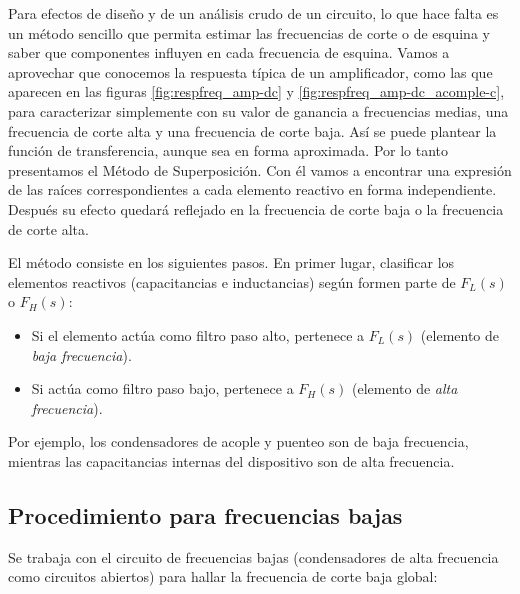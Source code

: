 Para efectos de diseño y de un análisis crudo de un circuito, lo que hace falta es un método sencillo que permita estimar las frecuencias de corte o de esquina y saber que componentes influyen en cada frecuencia de esquina. Vamos a aprovechar que conocemos la respuesta típica de un amplificador, como las que aparecen en las figuras \ref{fig:respfreq_amp-dc} y \ref{fig:respfreq_amp-dc_acomple-c}, para caracterizar simplemente con su valor de ganancia a frecuencias medias, una frecuencia de corte alta y una frecuencia de corte baja. Así se puede plantear la función de transferencia, aunque sea en forma aproximada. Por lo tanto presentamos el Método de Superposición. Con él vamos a encontrar una expresión de las raíces correspondientes a cada elemento reactivo en forma independiente. Después su efecto quedará reflejado en la frecuencia de corte baja o la frecuencia de corte alta.

El método consiste en los siguientes pasos. En primer lugar, clasificar los elementos reactivos (capacitancias e inductancias) según formen parte de \( F_L(s) \) o \( F_H(s) \):

\begin{itemize}
	\item Si el elemento actúa como filtro paso alto, pertenece a \( F_L(s) \) (elemento de \textit{baja frecuencia}).
	\item Si actúa como filtro paso bajo, pertenece a \( F_H(s) \) (elemento de \textit{alta frecuencia}).
\end{itemize}

Por ejemplo, los condensadores de acople y puenteo son de baja frecuencia, mientras las capacitancias internas del dispositivo son de alta frecuencia.

\subsection{Procedimiento para frecuencias bajas}

Se trabaja con el circuito de frecuencias bajas (condensadores de alta frecuencia como circuitos abiertos) para hallar la frecuencia de corte baja global:

